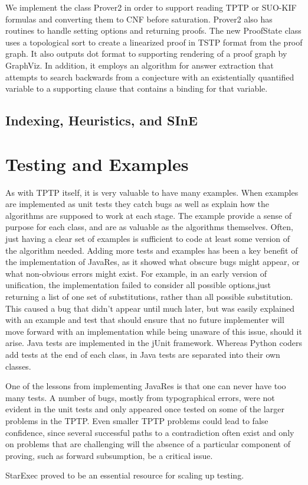 \documentclass{llncs}
\begin{document}
We implement the class Prover2 in order to support reading TPTP or SUO-KIF formulas and converting them
to CNF before saturation.  Prover2 also has routines to handle setting options and returning proofs.  The new
ProofState class uses a topological sort \cite{DBLP:journals/cacm/Kahn62} to create a linearized proof in
TSTP format from the proof graph.  It also outputs dot format to supporting rendering of a proof graph
by GraphViz.  In addition, it employs an algorithm for answer extraction that attempts to search backwards
from a conjecture with an existentially quantified variable to a supporting clause that contains a binding
for that variable.

\subsection{Indexing, Heuristics, and SInE}


\section{Testing and Examples}

As with TPTP itself, it is very valuable to have many examples.  When examples are implemented as
unit tests they catch bugs as well as explain how the algorithms are supposed to work at each stage.
The example provide a sense of purpose for each class, and are as valuable as the algorithms
themselves.  Often, just having a clear set of examples is sufficient to code at least some version
of the algorithm needed.  Adding more tests and examples has been a key benefit of the implementation
of JavaRes, as it showed what obscure bugs might appear, or what non-obvious errors might exist.
For example, in an early version of unification, the implementation failed to consider all possible
options,just returning a list of one set of substitutions, rather than all possible substitution.
This caused a bug that didn't appear until much later, but was easily explained with an example and
test that should ensure that no future implementer will move forward with an implementation while
being unaware of this issue, should it arise.  Java tests are implemented in the jUnit framework.
Whereas Python coders add tests at the end of each class, in Java tests  are separated into their
own classes.

One of the lessons from implementing JavaRes is that one can never have too many tests.  A number
of bugs, mostly from typographical errors, were not evident in the unit tests and only appeared
once tested on some of the larger problems in the TPTP.  Even smaller TPTP problems could lead to
false confidence, since several successful paths to a contradiction often exist and only on
problems that are challenging will the absence of a particular component of proving, such as
forward subsumption, be a critical issue.

StarExec proved to be an essential resource for scaling up testing.

\end{document}
